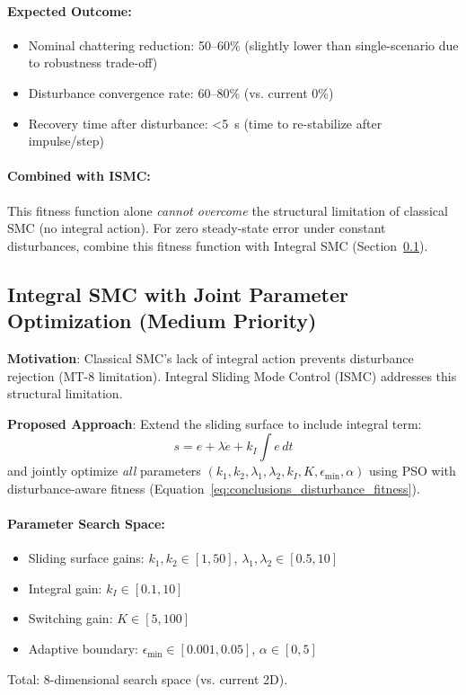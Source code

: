 \paragraph{Expected Outcome:}
\begin{itemize}
    \item Nominal chattering reduction: 50--60\% (slightly lower than single-scenario due to robustness trade-off)
    \item Disturbance convergence rate: 60--80\% (vs. current 0\%)
    \item Recovery time after disturbance: <5~s (time to re-stabilize after impulse/step)
\end{itemize}

\paragraph{Combined with ISMC:}
This fitness function alone \textit{cannot overcome} the structural limitation of classical SMC (no integral action). For zero steady-state error under constant disturbances, combine this fitness function with Integral SMC (Section~\ref{sec:conclusions_ismc_pso}).

\subsection{Integral SMC with Joint Parameter Optimization (Medium Priority)}
\label{sec:conclusions_ismc_pso}

\textbf{Motivation}: Classical SMC's lack of integral action prevents disturbance rejection (MT-8 limitation). Integral Sliding Mode Control (ISMC) addresses this structural limitation.

\textbf{Proposed Approach}: Extend the sliding surface to include integral term:
\begin{equation}
    s = e + \lambda \dot{e} + k_I \int e \, dt
    \label{eq:conclusions_ismc_surface}
\end{equation}
and jointly optimize \textit{all} parameters $(k_1, k_2, \lambda_1, \lambda_2, k_I, K, \epsilon_{\min}, \alpha)$ using PSO with disturbance-aware fitness (Equation~\ref{eq:conclusions_disturbance_fitness}).

\paragraph{Parameter Search Space:}
\begin{itemize}
    \item Sliding surface gains: $k_1, k_2 \in [1, 50]$, $\lambda_1, \lambda_2 \in [0.5, 10]$
    \item Integral gain: $k_I \in [0.1, 10]$
    \item Switching gain: $K \in [5, 100]$
    \item Adaptive boundary: $\epsilon_{\min} \in [0.001, 0.05]$, $\alpha \in [0, 5]$
\end{itemize}
Total: 8-dimensional search space (vs. current 2D).

